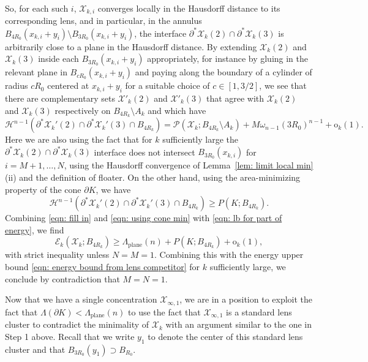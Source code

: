 \documentclass[10pt,reqno]{amsart}
\numberwithin{equation}{section}
\theoremstyle{definition}
\newcommand{\Pcal}{\mathcal{P}}
\DeclareMathOperator{\plane}{plane}
\newcommand{\X}{\mathcal{X}}
\begin{document}
{%
So, for each such $i$, $\X_{k,i}$ converges locally in the Hausdorff distance to its corresponding lens, and in particular, in the annulus $B_{4R_0}(x_{k,i}+y_i) \setminus B_{3R_0}(x_{k,i}+y_i)$, the interface $\partial^*\X_k(2) \cap \partial^*\X_k(3)$ is arbitrarily close to a plane in the Hausdorff distance.
%
By extending $\X_k(2)$ and $\X_k(3)$ inside each $B_{3R_0}(x_{k,i}+y_i)$ appropriately, for instance by gluing in the relevant plane in $B_{cR_0}(x_{k,i}+y_i)$ and paying along the boundary of a cylinder of radius $cR_0$ centered at $x_{k,i}+y_i$ for a suitable choice of $c\in [1,3/2]$, we see that there are complementary sets $\X'_k(2)$ and $\X'_k(3)$ that agree with $\X_k(2)$ and $\X_k(3)$ respectively on $B_{4R_k} \setminus A_k$ 
and which have
\begin{equation}\label{eqn: fill in}
\mathcal{H}^{n-1}(\partial^*\X_k'(2) \cap \partial^*\X_k'(3) \cap B_{4R_k}) = \Pcal(\X_k; B_{4R_k}\setminus A_k) +M \omega_{n-1}(3R_0)^{n-1} + \mathrm{o}_k(1).
\end{equation}
Here we are also using the fact that for $k$ sufficiently large the $\partial^*\X_k(2)\cap \partial^*\X_k(3)$ interface does not intersect $B_{3R_0}(x_{k,i})$ for $i=M+1,\dots , N$, using the Hausdorff convergence of Lemma~\ref{lem: limit local min}(ii) and the definition of floater.
On the other hand, using the area-minimizing property of the cone $\partial K$, we have 
\begin{equation}
    \label{eqn: using cone min}
\mathcal{H}^{n-1}(\partial^*\X_k'(2) \cap \partial^*\X_k'(3) \cap B_{4R_k}) \geq P(K ; B_{4R_k}).
\end{equation}
Combining \eqref{eqn: fill in} and \eqref{eqn: using cone min}  with \eqref{eqn: lb for part of energy}, we find 
\[
 \mathcal{E}_k(\X_k;B_{4R_k}) \geq  \Lambda_{\plane}(n) + P(K; B_{4R_k}) +  \mathrm{o}_k(1),
\]
with strict inequality unless $N=M=1$. Combining this with the energy upper bound \eqref{eqn: energy bound from lens competitor} for $k$ sufficiently large, we conclude by contradiction that $M=N=1.$

\medskip

\label{subsec:comp for lensshaped concentration}
Now that we have a single concentration $\X_{\infty,1}$, we are in a position to exploit the fact that $\Lambda(\partial K) < \Lambda_{\plane}(n)$ to use the fact that $\X_{\infty,1}$ is a standard lens cluster to contradict the minimality of $\X_k$ with an argument similar to the one in Step 1 above. Recall that we write $y_1$ to denote the center of this standard lens cluster and that $B_{3R_0}(y_1) \supset B_{R_0}.$

}
\end{document}

